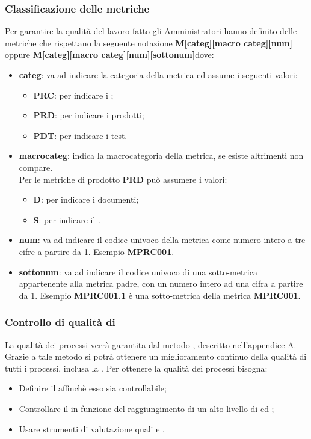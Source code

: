 \subsubsection{Classificazione delle metriche}
Per garantire la qualità del lavoro fatto gli Amministratori hanno definito delle metriche che rispettano la seguente notazione \textbf{M[categ][macro categ][num]} oppure \textbf{M[categ][macro categ][num][sottonum]}dove:
\begin{itemize}
    \item \textbf{categ}: va ad indicare la categoria della metrica ed assume i seguenti valori:
    \begin{itemize}
        \item \textbf{PRC}: per indicare i ;
        \item \textbf{PRD}: per indicare i prodotti;
        \item \textbf{PDT}: per indicare i test.
    \end{itemize} 
\end{itemize}
\begin{itemize}
    \item \textbf{macrocateg}: indica la macrocategoria della metrica, se esiste altrimenti non compare.\\
    Per le metriche di prodotto \textbf{PRD} può assumere i valori:
    \begin{itemize}
        \item \textbf{D}: per indicare i documenti;
        \item \textbf{S}: per indicare il .
    \end{itemize}
\end{itemize}
\begin{itemize}
    \item \textbf{num}: va ad indicare il codice univoco della metrica come numero intero a tre cifre a partire da 1. Esempio \textbf{MPRC001}.
    \item \textbf{sottonum}: va ad indicare il codice univoco di una sotto-metrica appartenente alla metrica padre, con un numero intero ad una cifra a partire da 1. Esempio \textbf{MPRC001.1} è una sotto-metrica della metrica \textbf{MPRC001}.
\end{itemize}

\subsubsection{Controllo di qualità di }
La qualità dei processi verrà garantita dal metodo , descritto nell'appendice A. Grazie a tale metodo si potrà ottenere un miglioramento continuo della qualità di tutti i processi, inclusa la . Per ottenere la qualità dei processi bisogna:
\begin{itemize}
    \item Definire il  affinchè esso sia controllabile;
    \item Controllare il  in funzione del raggiungimento di un alto livello di  ed ;
    \item Usare strumenti di valutazione quali  e .
\end{itemize}
